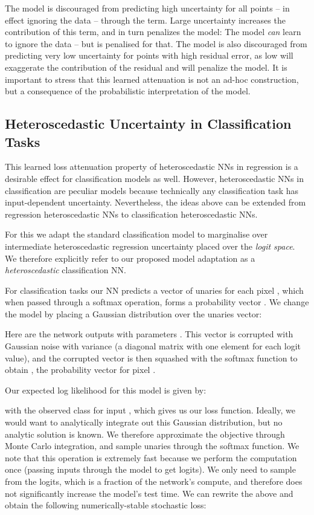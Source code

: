 \documentclass{article}
\begin{document}
The model is discouraged from predicting high uncertainty for all points -- in effect ignoring the data -- through the  term. Large uncertainty increases the contribution of this term, and in turn penalizes the model: The model \textit{can} learn to ignore the data -- but is penalised for that. The model is also discouraged from predicting very low uncertainty for points with high residual error, as low  will exaggerate the contribution of the residual and will penalize the model. It is important to stress that this learned attenuation is not an ad-hoc construction, but a consequence of the probabilistic interpretation of the model. 

\subsection{Heteroscedastic Uncertainty in Classification Tasks}

This learned loss attenuation property of heteroscedastic NNs in regression is a desirable effect for classification models as well. 
However, heteroscedastic NNs in classification are peculiar models because technically any classification task has input-dependent uncertainty. Nevertheless, the ideas above can be extended from regression heteroscedastic NNs to classification heteroscedastic NNs.

For this we adapt the standard classification model to marginalise over intermediate heteroscedastic regression uncertainty placed over the \textit{logit space}.
We therefore explicitly refer to our proposed model adaptation as a \textit{heteroscedastic} classification NN. 

For classification tasks our NN predicts a vector of unaries  for each pixel , which when passed through a softmax operation, forms a probability vector . We change the model by placing a Gaussian distribution over the unaries vector:

Here  are the network outputs with parameters . This vector  is corrupted with Gaussian noise with variance  (a diagonal matrix with one element for each logit value), and the corrupted vector is then squashed with the softmax function to obtain , the probability vector for pixel .

Our expected log likelihood for this model is given by:

with  the observed class for input ,
which gives us our loss function.
Ideally, we would want to analytically integrate out this Gaussian distribution, but no analytic solution is known.
We therefore approximate the objective through Monte Carlo integration, and sample unaries through the softmax function.
We note that this operation is extremely fast because we perform the computation once (passing inputs through the model to get logits). We only need to sample from the logits, which is a fraction of the network's compute, and therefore does not significantly increase the model's test time. 
We can rewrite the above and obtain the following numerically-stable stochastic loss:
\end{document}
